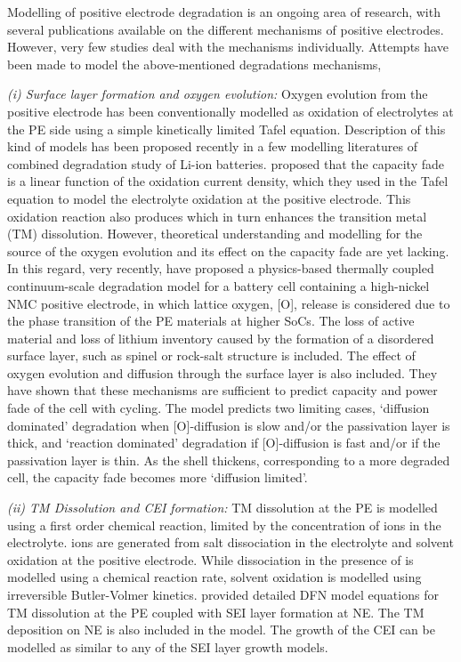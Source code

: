 \documentclass[aps,prb,twocolumn,superscriptaddress,reprint]{revtex4-1}
\begin{document}
Modelling of positive electrode degradation is an ongoing area of research, with several publications available on the different mechanisms of positive electrodes. However, very few studies deal with the mechanisms individually. Attempts have been made to model the above-mentioned degradations mechanisms, 

\textit{(i) Surface layer formation and oxygen evolution:} Oxygen evolution from the positive electrode has been conventionally modelled as oxidation of electrolytes at the PE side using a simple kinetically limited Tafel equation. Description of this kind of models has been proposed recently in a few modelling literatures of combined degradation study of Li-ion batteries. \cite{lin2013comprehensive,reniers2019review} \citeauthor{jana2019physical} proposed that the capacity fade is a linear function of the oxidation current density, which they used in the Tafel equation to model the electrolyte oxidation at the positive electrode. \cite{jana2019physical} This oxidation reaction also produces  which in turn enhances the transition metal (TM) dissolution. However, theoretical understanding and modelling for the source of the oxygen evolution and its effect on the capacity fade are yet lacking. In this regard, very recently, \citeauthor{ghosh2020shrinking} have proposed a physics-based thermally coupled continuum-scale degradation model for a battery cell containing a high-nickel NMC positive electrode, in which lattice oxygen, [O], release is considered due to the phase transition of the PE materials at higher SoCs. \cite{ghosh2020shrinking} The loss of active material and loss of lithium inventory caused by the formation of a disordered surface layer, such as spinel or rock-salt structure is included. The effect of oxygen evolution and diffusion through the surface layer is also included. They have shown that these mechanisms are sufficient to predict capacity and power fade of the cell with cycling. The model predicts two limiting cases, `diffusion dominated' degradation when [O]-diffusion is slow and/or the passivation layer is thick, and ‘reaction dominated’ degradation if [O]-diffusion is fast and/or if the passivation layer is thin. As the shell thickens, corresponding to a more degraded cell, the capacity fade becomes more `diffusion limited'.

\textit{(ii) TM Dissolution and CEI formation:} TM dissolution at the PE is modelled using a first order chemical reaction, limited by the concentration of  ions in the electrolyte. \cite{dai2012capacity}  ions are generated from  salt dissociation in the electrolyte and solvent oxidation at the positive electrode. While  dissociation in the presence of  is modelled using a chemical reaction rate, solvent oxidation is modelled using irreversible Butler-Volmer kinetics. \cite{dai2012capacity} \citeauthor{lin2013comprehensive} provided detailed DFN model equations for TM dissolution at the PE coupled with SEI layer formation at NE. \cite{lin2013comprehensive} The TM deposition on NE is also included in the model. The growth of the CEI can be modelled as similar to any of the SEI layer growth models. 
\end{document}
